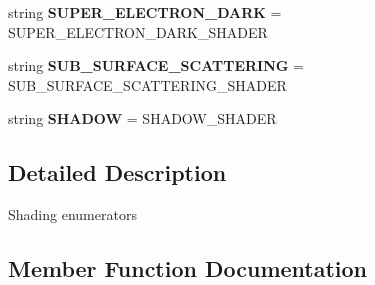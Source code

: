 \begin{DoxyCompactItemize}
\item 
string {\bfseries S\+U\+P\+E\+R\+\_\+\+E\+L\+E\+C\+T\+R\+O\+N\+\_\+\+D\+A\+RK} = \textquotesingle{}S\+U\+P\+E\+R\+\_\+\+E\+L\+E\+C\+T\+R\+O\+N\+\_\+\+D\+A\+R\+K\+\_\+\+S\+H\+A\+D\+ER\textquotesingle{}\hypertarget{classmeshy_1_1neuromorphovis_1_1enums_1_1shading__enums_1_1Shading_a058fce665e4797582d301b4f122434f2}{}\label{classmeshy_1_1neuromorphovis_1_1enums_1_1shading__enums_1_1Shading_a058fce665e4797582d301b4f122434f2}

\item 
string {\bfseries S\+U\+B\+\_\+\+S\+U\+R\+F\+A\+C\+E\+\_\+\+S\+C\+A\+T\+T\+E\+R\+I\+NG} = \textquotesingle{}S\+U\+B\+\_\+\+S\+U\+R\+F\+A\+C\+E\+\_\+\+S\+C\+A\+T\+T\+E\+R\+I\+N\+G\+\_\+\+S\+H\+A\+D\+ER\textquotesingle{}\hypertarget{classmeshy_1_1neuromorphovis_1_1enums_1_1shading__enums_1_1Shading_ab828e90e707671d4dd5d8f03a4a5e014}{}\label{classmeshy_1_1neuromorphovis_1_1enums_1_1shading__enums_1_1Shading_ab828e90e707671d4dd5d8f03a4a5e014}

\item 
string {\bfseries S\+H\+A\+D\+OW} = \textquotesingle{}S\+H\+A\+D\+O\+W\+\_\+\+S\+H\+A\+D\+ER\textquotesingle{}\hypertarget{classmeshy_1_1neuromorphovis_1_1enums_1_1shading__enums_1_1Shading_a78887950a8c263721047fe0d891c7852}{}\label{classmeshy_1_1neuromorphovis_1_1enums_1_1shading__enums_1_1Shading_a78887950a8c263721047fe0d891c7852}

\end{DoxyCompactItemize}


\subsection{Detailed Description}


\begin{DoxyVerb}Shading enumerators
\end{DoxyVerb}
 

\subsection{Member Function Documentation}
